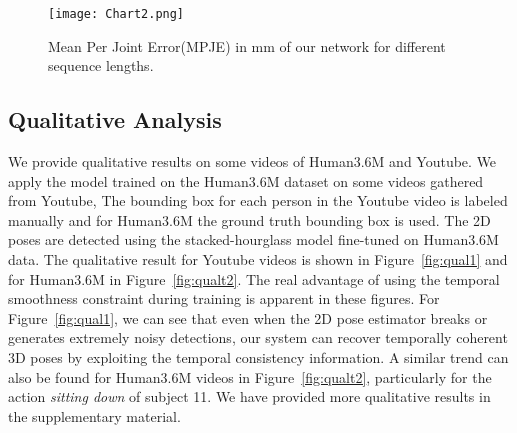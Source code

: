 \documentclass[runningheads]{llncs}
\begin{document}
\begin{figure}[t]
\begin{center}
\texttt{[image: Chart2.png]}
\end{center}
\caption{Mean Per Joint Error(MPJE) in mm of our network for different sequence lengths.}
\label{fig:chart}  
\end{figure}
\begin{figure*}
\begin{center}
\caption{Qualitative results on Youtube videos. Note on the sequence at the top, our network managed to predict meaningful 3D poses even when the 2D pose detections were poor using temporal information of the past.}
\vspace{-5mm}
\end{center}
\label{fig:qual1} 
\end{figure*}


\subsection{Qualitative Analysis}
We provide qualitative results on some videos of Human3.6M and Youtube. We apply the model trained on the Human3.6M dataset on some videos gathered from Youtube, The bounding box for each person in the Youtube video is labeled manually and for Human3.6M the ground truth bounding box is used. The 2D poses are detected using the stacked-hourglass model fine-tuned on Human3.6M data. The qualitative result for Youtube videos is shown in Figure~\ref{fig:qual1} and for Human3.6M in Figure~\ref{fig:qualt2}. The real advantage of using the temporal smoothness constraint during training is apparent in these figures. For Figure~\ref{fig:qual1}, we can see that even when the 2D pose estimator breaks or generates extremely noisy detections, our system can recover temporally coherent 3D poses by exploiting the temporal consistency information. A similar trend can also be found for Human3.6M videos in Figure~\ref{fig:qualt2}, particularly for the action \emph{sitting down} of subject 11. We have provided more qualitative results in the supplementary material.
\end{document}
